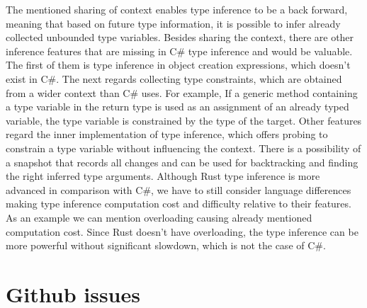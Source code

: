 \par
{}
The mentioned sharing of context enables type inference to be a back forward, meaning that based on future type information, it is possible to infer already collected unbounded type variables. 
Besides sharing the context, there are other inference features that are missing in C\# type inference and would be valuable. 
The first of them is type inference in object creation expressions, which doesn't exist in C\#. 
The next regards collecting type constraints, which are obtained from a wider context than C\# uses. 
For example, If a generic method containing a type variable in the return type is used as an assignment of an already typed variable, the type variable is constrained by the type of the target. Other features regard the inner implementation of type inference, which offers probing to constrain a type variable without influencing the context. 
There is a possibility of a snapshot that records all changes and can be used for backtracking and finding the right inferred type arguments.
Although Rust type inference is more advanced in comparison with C\#, we have to still consider language differences making type inference computation cost and difficulty relative to their features. As an example we can mention overloading causing already mentioned computation cost. 
Since Rust doesn't have overloading, the type inference can be more powerful without significant slowdown, which is not the case of C\#.

\section{Github issues}

